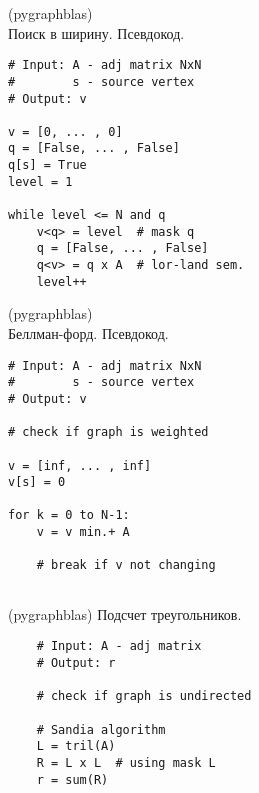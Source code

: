 \begin{minipage}{0.46\textwidth}
\begin{algorithm}[H]
\centering
\caption{(pygraphblas)\\Поиск в ширину. Псевдокод.}\label{bfs_pygrb}
\begin{verbatim}
# Input: A - adj matrix NxN
#        s - source vertex
# Output: v

v = [0, ... , 0]
q = [False, ... , False]
q[s] = True
level = 1

while level <= N and q
    v<q> = level  # mask q
    q = [False, ... , False]
    q<v> = q x A  # lor-land sem.
    level++
\end{verbatim}
\end{algorithm}
\end{minipage}\hfill
\begin{minipage}{0.46\textwidth}
\begin{algorithm}[H]
\centering
\caption{(pygraphblas)\\Беллман-форд. Псевдокод.}\label{bford_pygrb}
\begin{verbatim}
# Input: A - adj matrix NxN
#        s - source vertex
# Output: v

# check if graph is weighted

v = [inf, ... , inf]
v[s] = 0

for k = 0 to N-1:
    v = v min.+ A 
    
    # break if v not changing
    
\end{verbatim}
\end{algorithm}
\end{minipage}\par
\begin{minipage}{0.96\textwidth}
\begin{algorithm}[H]
    \centering
    \caption{(pygraphblas) Подсчет треугольников.}\label{tri_pygrb}
    \begin{verbatim}
    # Input: A - adj matrix
    # Output: r
    
    # check if graph is undirected
    
    # Sandia algorithm
    L = tril(A)
    R = L x L  # using mask L
    r = sum(R)
    \end{verbatim}
\end{algorithm}
\end{minipage}\hfill

